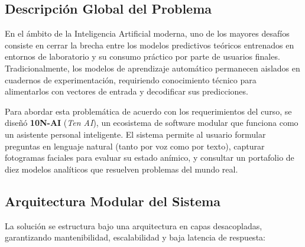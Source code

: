 \documentclass[12pt,letterpaper]{article}
\begin{document}
\subsection{Descripción Global del Problema}
En el ámbito de la Inteligencia Artificial moderna, uno de los mayores desafíos consiste en cerrar la brecha entre los modelos predictivos teóricos entrenados en entornos de laboratorio y su consumo práctico por parte de usuarios finales. Tradicionalmente, los modelos de aprendizaje automático permanecen aislados en cuadernos de experimentación, requiriendo conocimiento técnico para alimentarlos con vectores de entrada y decodificar sus predicciones.

Para abordar esta problemática de acuerdo con los requerimientos del curso, se diseñó \textbf{10N-AI} (\textit{Ten AI}), un ecosistema de software modular que funciona como un asistente personal inteligente. El sistema permite al usuario formular preguntas en lenguaje natural (tanto por voz como por texto), capturar fotogramas faciales para evaluar su estado anímico, y consultar un portafolio de diez modelos analíticos que resuelven problemas del mundo real.

\subsection{Arquitectura Modular del Sistema}
La solución se estructura bajo una arquitectura en capas desacopladas, garantizando mantenibilidad, escalabilidad y baja latencia de respuesta:
\end{document}

